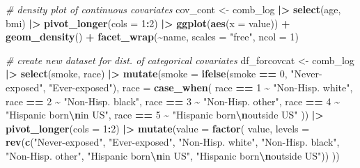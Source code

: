 \documentclass[12pt, twoside]{amherstthesis}
\newenvironment{Shaded}{\begin{snugshade}}{\end{snugshade}}
\newcommand{\AttributeTok}[1]{\textcolor[rgb]{0.13,0.29,0.53}{#1}}
\newcommand{\CommentTok}[1]{\textcolor[rgb]{0.56,0.35,0.01}{\textit{#1}}}
\newcommand{\DecValTok}[1]{\textcolor[rgb]{0.00,0.00,0.81}{#1}}
\newcommand{\FunctionTok}[1]{\textcolor[rgb]{0.13,0.29,0.53}{\textbf{#1}}}
\newcommand{\NormalTok}[1]{#1}
\newcommand{\OtherTok}[1]{\textcolor[rgb]{0.56,0.35,0.01}{#1}}
\newcommand{\SpecialCharTok}[1]{\textcolor[rgb]{0.81,0.36,0.00}{\textbf{#1}}}
\newcommand{\StringTok}[1]{\textcolor[rgb]{0.31,0.60,0.02}{#1}}
\begin{document}
\scriptsize
\begin{Shaded}
\begin{Highlighting}[]
\CommentTok{\# density plot of continuous covariates}
\NormalTok{cov\_cont }\OtherTok{\textless{}{-}}\NormalTok{ comb\_log }\SpecialCharTok{|\textgreater{}} 
  \FunctionTok{select}\NormalTok{(age, bmi) }\SpecialCharTok{|\textgreater{}} 
  \FunctionTok{pivot\_longer}\NormalTok{(}\AttributeTok{cols =} \DecValTok{1}\SpecialCharTok{:}\DecValTok{2}\NormalTok{) }\SpecialCharTok{|\textgreater{}} 
  \FunctionTok{ggplot}\NormalTok{(}\FunctionTok{aes}\NormalTok{(}\AttributeTok{x =}\NormalTok{ value)) }\SpecialCharTok{+}
  \FunctionTok{geom\_density}\NormalTok{() }\SpecialCharTok{+} 
  \FunctionTok{facet\_wrap}\NormalTok{(}\SpecialCharTok{\textasciitilde{}}\NormalTok{name, }\AttributeTok{scales =} \StringTok{"free"}\NormalTok{, }\AttributeTok{ncol =} \DecValTok{1}\NormalTok{) }

\CommentTok{\# create new dataset for dist. of categorical covariates}
\NormalTok{df\_forcovcat }\OtherTok{\textless{}{-}}\NormalTok{ comb\_log }\SpecialCharTok{|\textgreater{}} 
  \FunctionTok{select}\NormalTok{(smoke, race) }\SpecialCharTok{|\textgreater{}} 
  \FunctionTok{mutate}\NormalTok{(}\AttributeTok{smoke =} \FunctionTok{ifelse}\NormalTok{(smoke }\SpecialCharTok{==} \DecValTok{0}\NormalTok{, }\StringTok{"Never{-}exposed"}\NormalTok{, }\StringTok{"Ever{-}exposed"}\NormalTok{), }
         \AttributeTok{race =} \FunctionTok{case\_when}\NormalTok{(}
\NormalTok{           race }\SpecialCharTok{==} \DecValTok{1} \SpecialCharTok{\textasciitilde{}} \StringTok{"Non{-}Hisp. white"}\NormalTok{, }
\NormalTok{           race }\SpecialCharTok{==} \DecValTok{2} \SpecialCharTok{\textasciitilde{}} \StringTok{"Non{-}Hisp. black"}\NormalTok{, }
\NormalTok{           race }\SpecialCharTok{==} \DecValTok{3} \SpecialCharTok{\textasciitilde{}} \StringTok{"Non{-}Hisp. other"}\NormalTok{, }
\NormalTok{           race }\SpecialCharTok{==} \DecValTok{4} \SpecialCharTok{\textasciitilde{}} \StringTok{"Hispanic born}\SpecialCharTok{\textbackslash{}n}\StringTok{in US"}\NormalTok{, }
\NormalTok{           race }\SpecialCharTok{==} \DecValTok{5} \SpecialCharTok{\textasciitilde{}} \StringTok{"Hispanic born}\SpecialCharTok{\textbackslash{}n}\StringTok{outside US"}
\NormalTok{         )) }\SpecialCharTok{|\textgreater{}} 
  \FunctionTok{pivot\_longer}\NormalTok{(}\AttributeTok{cols =} \DecValTok{1}\SpecialCharTok{:}\DecValTok{2}\NormalTok{) }\SpecialCharTok{|\textgreater{}} 
  \FunctionTok{mutate}\NormalTok{(}\AttributeTok{value =} \FunctionTok{factor}\NormalTok{(}
\NormalTok{    value, }\AttributeTok{levels =} \FunctionTok{rev}\NormalTok{(}\FunctionTok{c}\NormalTok{(}\StringTok{"Never{-}exposed"}\NormalTok{, }\StringTok{"Ever{-}exposed"}\NormalTok{,}
                      \StringTok{"Non{-}Hisp. white"}\NormalTok{, }\StringTok{"Non{-}Hisp. black"}\NormalTok{, }\StringTok{"Non{-}Hisp. other"}\NormalTok{, }
                      \StringTok{"Hispanic born}\SpecialCharTok{\textbackslash{}n}\StringTok{in US"}\NormalTok{, }\StringTok{"Hispanic born}\SpecialCharTok{\textbackslash{}n}\StringTok{outside US"}\NormalTok{))}
\NormalTok{  )) }


\end{Highlighting}
\end{Shaded}
\end{document}
